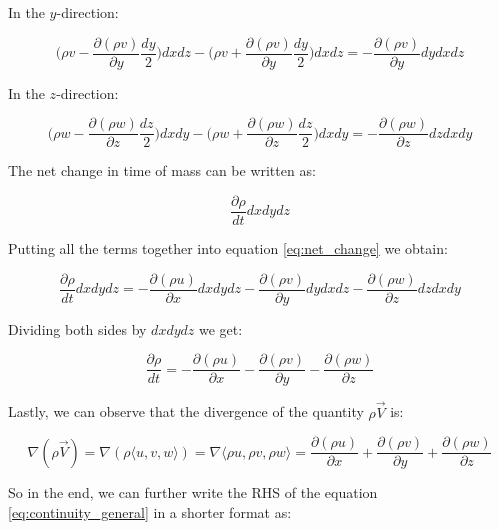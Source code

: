 In the $y$-direction:

\begin{equation}
\Big( \rho v - \frac{\partial (\rho v)}{\partial y} \frac{dy}{2} \Big) dx dz - \Big( \rho v + \frac{\partial (\rho v)}{\partial y} \frac{dy}{2} \Big) dx dz = - \frac{\partial (\rho v)}{\partial y} dy dx dz
\end{equation}

In the $z$-direction:

\begin{equation}
\Big( \rho w - \frac{\partial (\rho w)}{\partial z} \frac{dz}{2} \Big) dx dy - \Big( \rho w + \frac{\partial (\rho w)}{\partial z} \frac{dz}{2} \Big) dx dy = - \frac{\partial (\rho w)}{\partial z} dz dx dy
\end{equation}

The net change in time of mass can be written as:

\begin{equation}
\frac{\partial \rho}{dt} dx dy dz
\end{equation}

Putting all the terms together into equation \ref{eq:net_change} we obtain:

\begin{equation}
\frac{\partial \rho}{dt} dx dy dz = - \frac{\partial (\rho u)}{\partial x} dx dy dz - \frac{\partial (\rho v)}{\partial y} dy dx dz - \frac{\partial (\rho w)}{\partial z} dz dx dy
\end{equation}

Dividing both sides by $dx dy dz$ we get:

\begin{equation} \label{eq:continuity_general}
\frac{\partial \rho}{dt} = - \frac{\partial (\rho u)}{\partial x} - \frac{\partial (\rho v)}{\partial y} - \frac{\partial (\rho w)}{\partial z}
\end{equation}

Lastly, we can observe that the divergence of the quantity $\rho \vec{V}$ is:

\begin{equation}
\nabla (\rho \vec{V}) = \nabla (\rho \langle u, v, w \rangle) = \nabla \langle \rho u, \rho v, \rho w \rangle = \frac{\partial (\rho u)}{\partial x} + \frac{\partial (\rho v)}{\partial y} + \frac{\partial (\rho w)}{\partial z}
\end{equation}

So in the end, we can further write the RHS of the equation \ref{eq:continuity_general} in a shorter format as:

